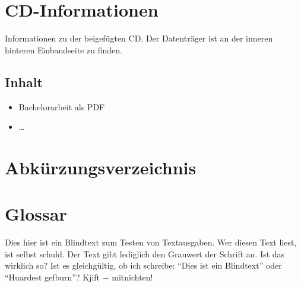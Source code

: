 \documentclass[a4paper,11pt,headsepline]{report} %
\newcommand{\sblindtext}{Dies hier ist ein Blindtext zum Testen von Textausgaben. Wer diesen Text liest, ist selbst schuld. Der Text gibt lediglich den Grauwert der Schrift an. Ist das wirklich so? Ist es gleichg\"{u}ltig, ob ich schreibe: ``Dies ist ein Blindtext'' oder ``Huardest gefburn''? Kjift $-$ mitnichten!}
\begin{document}




\chapter*{CD-Informationen}
Informationen zu der beigefügten CD. Der Datenträger ist an der inneren hinteren Einbandseite zu finden.

\section*{Inhalt}
\begin{itemize}
	\item Bachelorarbeit als PDF
	\item \dots
\end{itemize}




\chapter*{Abkürzungsverzeichnis}
\begin{acronym}[LängsteAbkürzungHierRein]
\end{acronym}
\clearpage

\chapter*{Glossar}
\label{cha:glossar}

\begin{description}[leftmargin=3cm,style=nextline]
	\item[Beispiel]
		\sblindtext
\end{description}
\clearpage

\listoffigures
\clearpage

\listoftables
\clearpage

\renewcommand{\lstlistlistingname}{Listingverzeichnis}
\lstlistoflistings
{}
\clearpage

\printbibliography
{}
\end{document}
